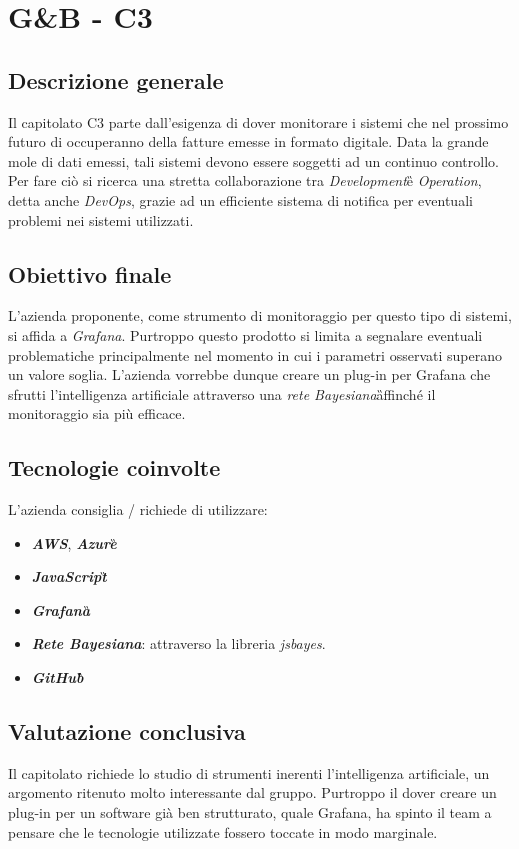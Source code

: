 \section{G\&B - C3} \label{c3}
    \subsection{Descrizione generale}
    Il capitolato C3 parte dall'esigenza di dover monitorare i sistemi che nel prossimo futuro di occuperanno della fatture emesse in formato digitale. Data la grande mole di dati emessi, tali sistemi devono essere soggetti ad un continuo controllo. Per fare ciò si ricerca una stretta collaborazione tra \textit{Development}\G e \textit{Operation}\GAlt, detta anche \textit{DevOps}\GAlt, grazie ad un efficiente sistema di notifica per eventuali problemi nei sistemi utilizzati.

    \subsection{Obiettivo finale}
    L'azienda proponente, come strumento di monitoraggio per questo tipo di sistemi, si affida a \textit{Grafana}\GAlt. Purtroppo questo prodotto si limita a segnalare eventuali problematiche principalmente nel momento in cui i parametri osservati superano un valore soglia. L'azienda vorrebbe dunque creare un plug-in per Grafana che sfrutti l'intelligenza artificiale attraverso una \textit{rete Bayesiana}\G affinché il monitoraggio sia più efficace.

    \subsection{Tecnologie coinvolte}
    L'azienda consiglia / richiede di utilizzare:
    \begin{itemize}
    	\item \textit{\textbf{AWS}}\GAlt, \textit{\textbf{Azure}}\G
    	\item \textit{\textbf{JavaScript}}\G
    	\item \textit{\textbf{Grafana}}\G
    	\item \textit{\textbf{Rete Bayesiana}}\GAlt: attraverso la libreria \textit{jsbayes}.
    	\item \textit{\textbf{GitHub}}\G
    \end{itemize}

    \subsection{Valutazione conclusiva}
    Il capitolato richiede lo studio di strumenti inerenti l'intelligenza artificiale, un argomento ritenuto molto interessante dal gruppo. Purtroppo il dover creare un plug-in per un software già ben strutturato, quale Grafana, ha spinto il team a pensare che le tecnologie utilizzate fossero toccate in modo marginale.
